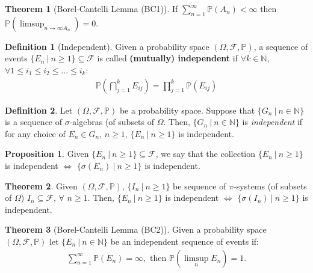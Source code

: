 \documentclass[11pt]{article}
\theoremstyle{definition}
\newtheorem{defn}{Definition}[section]
\newtheorem{prop}{Proposition}[section]
\theoremstyle{theorem}
\newtheorem{thm}{Theorem}[section]
\newcommand{\N}[0]{\mathbb{N}}
\newcommand{\prob}[1]{\mathbb{P}\left(#1 \right)}
\begin{document}
\begin{thm}[Borel-Cantelli Lemma (BC1)] 
	If \( \sum_{n=1}^\infty \prob{A_n} < \infty \) then \( \prob{ \limsup_{n \rightarrow \infty A_n }} = 0 \). 
\end{thm}

\begin{defn}[Independent]
	Given a probability space \( ( \Omega, \mathcal{F}, \mathbb{P}) \), a sequence of events \( \{ E_n\ |\ n \geq 1 \} \subseteq \mathcal{F} \) is called \textbf{(mutually) independent} if \( \forall k \in \N \), \( \forall 1 \leq i_1 \leq i_2 \leq ... \leq i_k \):
	\begin{align*}
		\prob{  \bigcap_{j=1}^k E_{ij}} = \prod_{j=1}^k \prob{ E_{ij} }
	\end{align*}
\end{defn}

\begin{defn}
Let \( (\Omega, \mathcal{F}, \mathbb{P} ) \) be a probability space. Suppose that \( \{ G_n\ |\ n \in \N \} \) is a sequence of 	\( \sigma \)-algebras (of subsets of \( \Omega \). Then, \( \{ G_n\ |\ n \in \N \} \) is \emph{independent} if for any choice of \( E_n \in G_n \), \( n \geq 1 \), \( \{ E_n\ |\ n \geq 1 \} \) is independent. 
\end{defn}

\begin{prop}
Given \( \{ E_n\ |\ n \geq 1 \} \subseteq \mathcal{F} \), we say that the collection \( \{ E_n\ |\ n \geq 1 \} \) is independent \( \iff \) \( \{ \sigma(E_n)\ |\ n \geq 1 \} \) is independent. 
\end{prop}

\begin{thm}
	Given \( (\Omega, \mathcal{F}, \mathbb{P}) \), \( \{ I_n\ |\ n \geq 1 \} \) be sequence of \( \pi \)-systems (of subsets of \( \Omega \)) \( I_n \subseteq \mathcal{F} \), \( \forall \) \( n \geq 1 \). Then, \( \{ E_n\ |\ n \geq 1 \} \) is independent \( \iff \) \( \{ \sigma (I_n)\ |\ n \geq 1 \} \) is independent. 
\end{thm}

\begin{thm}[Borel-Cantelli Lemma (BC2)] 
	Given a probability space \( (\Omega, \mathcal{F}, \mathbb{P}) \) let \( \{ E_n\ |\ n \in \N \} \) be an independent sequence of events if: 
	\begin{align}
		\sum_{n=1}^\infty \prob{E_n} = \infty, \text{ then } \prob{ \limsup_{n} E_n } = 1. 	
	\end{align}
	
\end{thm}
\end{document}
